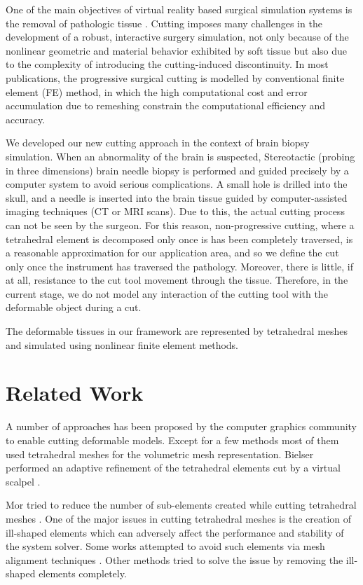 \label{chapter:Cutting}
One of the main objectives of virtual reality based surgical simulation systems is the removal of pathologic tissue 
\cite{Steinemann, Nienhuys2001a}. Cutting imposes many challenges in the development of a robust, interactive surgery 
simulation, not only because of the nonlinear geometric and material behavior exhibited by soft tissue but also due to the
complexity of introducing the cutting-induced discontinuity. In most publications, the progressive surgical cutting is modelled
by conventional finite element (FE) method, in which the high computational cost and error accumulation due to remeshing constrain 
the computational efficiency and accuracy. 

We developed our new cutting approach in the context of brain biopsy simulation. When an abnormality of the brain is suspected, 
Stereotactic (probing in three dimensions) brain needle biopsy is performed and guided precisely by a computer system to avoid 
serious complications. A small hole is drilled into the skull, and a needle is inserted into the brain tissue guided by computer-assisted 
imaging techniques (CT or MRI scans). Due to this, the actual cutting process can not be seen by the surgeon. For this reason,
non-progressive cutting, where a tetrahedral element is decomposed only once is has been completely traversed, is a reasonable
approximation for our application area, and so we define the cut only once the instrument has traversed the pathology. 
Moreover, there is little, if at all, resistance to the cut tool movement through the tissue. Therefore, in the current stage, we do 
not model any interaction of the cutting tool with the deformable object during a cut. 

The deformable tissues in our framework are represented by tetrahedral meshes and simulated using nonlinear finite element methods. 

\section{Related Work}
A number of approaches has been proposed by the computer graphics community to enable cutting deformable models. 
Except for a few methods most of them used tetrahedral meshes for the volumetric mesh representation. 
Bielser \etal performed an adaptive refinement of the tetrahedral elements cut by a virtual scalpel \cite{Bielser1999}.

Mor \etal tried to reduce the number of sub-elements created while cutting tetrahedral meshes \cite{Mor2000}.
One of the major issues in cutting tetrahedral meshes is the creation of ill-shaped elements which can adversely affect the
performance and stability of the system solver. Some works attempted to avoid such elements via mesh alignment techniques 
\cite{Nienhuys2001a, Steinemann2006}. Other methods tried to solve the issue by removing the ill-shaped elements completely.




